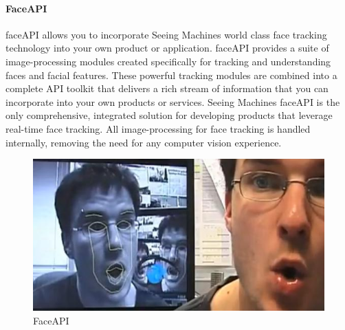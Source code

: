 \paragraph*{FaceAPI}
faceAPI allows you to incorporate Seeing Machines world class face tracking technology into your own product or application. faceAPI provides a suite of image-processing modules created specifically for tracking and understanding faces and facial features. These powerful tracking modules are combined into a complete API toolkit that delivers a rich stream of information that you can incorporate into your own products or services. Seeing Machines faceAPI is the only comprehensive, integrated solution for developing products that leverage real-time face tracking. All image-processing for face tracking is handled internally, removing the need for any computer vision experience.

\begin{figure}[htpb]
		\includegraphics[width=.6\linewidth]{img/faceapi}
		\caption{FaceAPI}
\end{figure}
